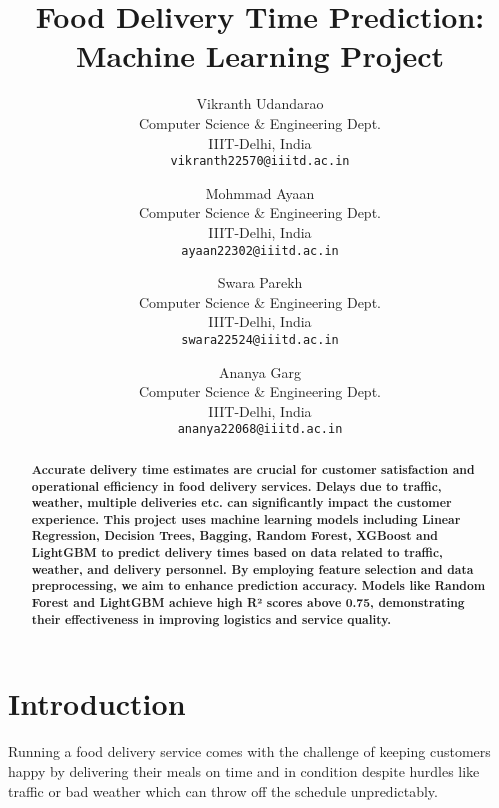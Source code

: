 \documentclass[10pt,twocolumn,letterpaper]{article}
\begin{document}
\title{Food Delivery Time Prediction: Machine Learning Project}

\author{
Vikranth Udandarao\\
Computer Science \& Engineering Dept. \\
IIIT-Delhi, India \\
{\tt\small vikranth22570@iiitd.ac.in}
\and
Mohmmad Ayaan \\
Computer Science \& Engineering Dept. \\
IIIT-Delhi, India \\
{\tt\small ayaan22302@iiitd.ac.in}
\and
Swara Parekh \\
Computer Science \& Engineering Dept. \\
IIIT-Delhi, India \\
{\tt\small swara22524@iiitd.ac.in}
\and
Ananya Garg \\
Computer Science \& Engineering Dept. \\
IIIT-Delhi, India \\
{\tt\small ananya22068@iiitd.ac.in}
}

\maketitle


\begin{abstract}
    \textbf{Accurate delivery time estimates are crucial for customer satisfaction and operational efficiency in food delivery services. Delays due to traffic, weather, multiple deliveries etc. can significantly impact the customer experience. This project uses machine learning models including Linear Regression, Decision Trees, Bagging, Random Forest, XGBoost and LightGBM to predict delivery times based on data related to traffic, weather, and delivery personnel. By employing feature selection and data preprocessing, we aim to enhance prediction accuracy. Models like Random Forest and LightGBM achieve high R² scores above 0.75, demonstrating their effectiveness in improving logistics and service quality.}
\end{abstract}

\section{Introduction}
Running a food delivery service comes with the challenge of keeping customers happy by delivering their meals on time and in condition despite hurdles like traffic or bad weather which can throw off the schedule unpredictably.
\end{document}
